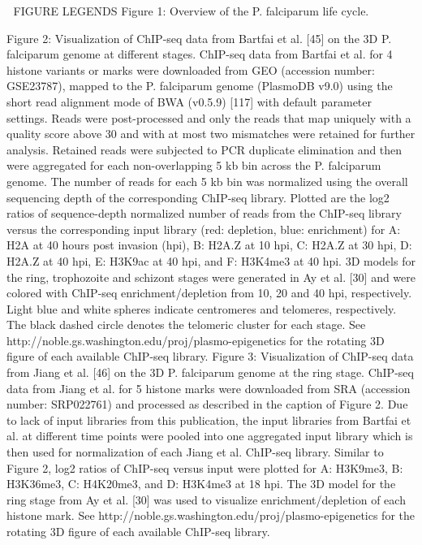 
FIGURE LEGENDS
Figure 1: Overview of the P. falciparum life cycle.
 
 Figure 2: Visualization of ChIP-seq data from Bartfai et al. [45] on the 3D
 P. falciparum genome at different stages.
 ChIP-seq data from Bartfai et al. for 4 histone variants or marks were
 downloaded from GEO (accession number: GSE23787), mapped to the P. falciparum
 genome (PlasmoDB v9.0) using the short read alignment mode of BWA (v0.5.9)
 [117] with default parameter settings. Reads were post-processed and only the
 reads that map uniquely with a quality score above 30 and with at most two
 mismatches were retained for further analysis. Retained reads were subjected
 to PCR duplicate elimination and then were aggregated for each
 non-overlapping 5 kb bin across the P. falciparum genome. The number of reads
 for each 5 kb bin was normalized using the overall sequencing depth of the
 corresponding ChIP-seq library. Plotted are the log2 ratios of sequence-depth
 normalized number of reads from the ChIP-seq library versus the corresponding
 input library (red: depletion, blue: enrichment) for A: H2A at 40 hours post
 invasion (hpi), B: H2A.Z at 10 hpi, C: H2A.Z at 30 hpi, D: H2A.Z at 40 hpi,
 E: H3K9ac at 40 hpi, and F: H3K4me3 at 40 hpi. 3D models for the ring,
 trophozoite and schizont stages were generated in Ay et al. [30] and were
 colored with ChIP-seq enrichment/depletion from 10, 20 and 40 hpi,
 respectively. Light blue and white spheres indicate centromeres and
 telomeres, respectively. The black dashed circle denotes the telomeric
 cluster for each stage. See
 http://noble.gs.washington.edu/proj/plasmo-epigenetics for the rotating 3D
 figure of each available ChIP-seq library.
 Figure 3: Visualization of ChIP-seq data from Jiang et al. [46] on the 3D P.
 falciparum genome at the ring stage.
 ChIP-seq data from Jiang et al. for 5 histone marks were downloaded from SRA
 (accession number: SRP022761) and processed as described in the caption of
 Figure 2. Due to lack of input libraries from this publication, the input
 libraries from Bartfai et al. at different time points were pooled into one
 aggregated input library which is then used for normalization of each Jiang
 et al. ChIP-seq library. Similar to Figure 2, log2 ratios of ChIP-seq versus
 input were plotted for A: H3K9me3, B: H3K36me3, C: H4K20me3, and D: H3K4me3
 at 18 hpi. The 3D model for the ring stage from Ay et al. [30] was used to
 visualize enrichment/depletion of each histone mark. See
 http://noble.gs.washington.edu/proj/plasmo-epigenetics for the rotating 3D
 figure of each available ChIP-seq library.
